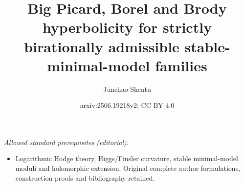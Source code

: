 \documentclass[11pt,letterpaper]{amsart}
\title{Big Picard, Borel and Brody hyperbolicity for strictly birationally admissible stable-minimal-model families}
\author{Junchao Shentu}
\date{arxiv:2506.19218v2; CC BY 4.0}
\numberwithin{equation}{section}
\begin{document}
\maketitle
\noindent\textit{Allowed standard prerequisites (editorial).}\begin{itemize}
\item Logarithmic Hodge theory, Higgs/Finsler curvature, stable minimal-model moduli and holomorphic extension. Original complete author formulations, construction proofs and bibliography retained.
\end{itemize}\medskip
	\theoremstyle{plain}
	\newtheorem{thm}{Theorem}[section]
	\newtheorem{lem}[thm]{Lemma}
	\newtheorem{cor}[thm]{Corollary}
	\newtheorem{cor*}[thm]{Corollary*}
	\newtheorem{prop}[thm]{Proposition}
	\newtheorem{prop*}[thm]{Proposition*}
	\newtheorem{conj}[thm]{Conjecture}
	\theoremstyle{definition}
	\newtheorem{construction}{Construction}
	\newtheorem{notations}[thm]{Notations}
	\newtheorem{question}[thm]{Question}
	\newtheorem{prob}[thm]{Problem}
	\newtheorem{rmk}[thm]{Remark}
	\newtheorem{remarks}[thm]{Remarks}
	\newtheorem{defn}[thm]{Definition}
	\newtheorem{claim}[thm]{Claim}
	\newtheorem{assumption}[thm]{Assumption}
	\newtheorem{assumptions}[thm]{Assumptions}
	\newtheorem{properties}[thm]{Properties}
	\newtheorem{exmp}[thm]{Example}
	\newtheorem{comments}[thm]{Comments}
	\newtheorem{blank}[thm]{}
	\newtheorem{observation}[thm]{Observation}
	\newtheorem{defn-thm}[thm]{Definition-Theorem}
	\newtheorem*{Setting}{Setting}
	
	
	\newcommand{\sA}{\mathscr{A}}
	\newcommand{\sB}{\mathscr{B}}
	\newcommand{\sC}{\mathscr{C}}
	\newcommand{\sD}{\mathscr{D}}
	\newcommand{\sE}{\mathscr{E}}
	\newcommand{\sF}{\mathscr{F}}
	\newcommand{\sG}{\mathscr{G}}
	\newcommand{\sH}{\mathscr{H}}
	\newcommand{\sI}{\mathscr{I}}
	\newcommand{\sJ}{\mathscr{J}}
	\newcommand{\sK}{\mathscr{K}}
	\newcommand{\sL}{\mathscr{L}}
	\newcommand{\sM}{\mathscr{M}}
	\newcommand{\sN}{\mathscr{N}}
	\newcommand{\sO}{\mathscr{O}}
	\newcommand{\sP}{\mathscr{P}}
	\newcommand{\sQ}{\mathscr{Q}}
	\newcommand{\sR}{\mathscr{R}}
	\newcommand{\sS}{\mathscr{S}}
	\newcommand{\sT}{\mathscr{T}}
	\newcommand{\sU}{\mathscr{U}}
	\newcommand{\sV}{\mathscr{V}}
	\newcommand{\sW}{\mathscr{W}}
	\newcommand{\sX}{\mathscr{X}}
	\newcommand{\sY}{\mathscr{Y}}
	\newcommand{\sZ}{\mathscr{Z}}
	\newcommand{\bZ}{\mathbb{Z}}
	\newcommand{\bN}{\mathbb{N}}
	\newcommand{\bQ}{\mathbb{Q}}
	\newcommand{\bC}{\mathbb{C}}
	\newcommand{\bR}{\mathbb{R}}
	\newcommand{\bH}{\mathbb{H}}
	\newcommand{\bD}{\mathbb{D}}
	\newcommand{\bE}{\mathbb{E}}
	\newcommand{\bP}{\mathbb{P}}
	\newcommand{\bV}{\mathbb{V}}
	\newcommand{\cV}{\mathcal{V}}
	\newcommand{\cF}{\mathcal{F}}
	\newcommand{\cI}{\mathcal{I}}
	\newcommand{\cW}{\mathcal{W}}
	\newcommand{\cU}{\mathcal{U}}
	\newcommand{\bfM}{\mathbf{M}}
	\newcommand{\bfN}{\mathbf{N}}
	\newcommand{\bfX}{\mathbf{X}}
	\newcommand{\bfY}{\mathbf{Y}}
	\newcommand{\spec}{\textrm{Spec}}
	\newcommand{\dbar}{\bar{\partial}}
	\newcommand{\ddbar}{\partial\bar{\partial}}
	\newcommand{\redref}{{\color{red}ref}}
	
\end{document}
